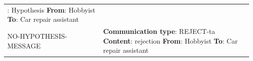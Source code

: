 \begin{tabular}{|>{\colleft}p{3cm}|>{\colleft}p{8.5cm}|}
					  {\bf Content}: Hypothesis\newline
					  {\bf From}: Hobbyist\newline
					  {\bf To}: Car repair assistant\\
NO-HYPOTHESIS-MESSAGE		& {\bf Communication type}: REJECT-ta\newline
					  {\bf Content}: rejection \newline
					  {\bf From}: Hobbyist\newline
					  {\bf To}: Car repair assistant\\\hline
\end{tabular}



